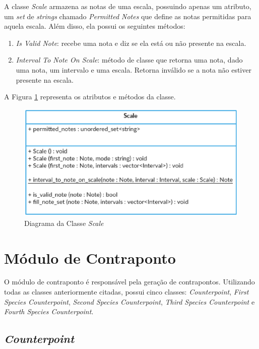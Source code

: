     A classe \textit{Scale} armazena as notas de uma escala, possuindo apenas um atributo, um \textit{set} de \textit{strings} chamado \textit{Permitted Notes} que define as notas permitidas para aquela escala. Além disso, ela possui os seguintes métodos:

    \begin{enumerate}
      \item \textit{Is Valid Note}: recebe uma nota e diz se ela está ou não presente na escala.
      \item \textit{Interval To Note On Scale}: método de classe que retorna uma nota, dado uma nota, um intervalo e uma escala. Retorna inválido se a nota não estiver presente na escala.
    \end{enumerate}


    A Figura \ref{scaleclass} representa os atributos e métodos da classe.

    \begin{figure}[htb]
      \centering
      \includegraphics[scale=0.7]{figuras/scaleclass.eps}
      \caption{Diagrama da Classe \textit{Scale}}
      \label{scaleclass}
    \end{figure}

  \section[Módulo de Contraponto]{Módulo de Contraponto}

    O módulo de contraponto é responsável pela geração de contrapontos. Utilizando todas as classes anteriormente citadas, possui cinco classes: \textit{Counterpoint}, \textit{First Species Counterpoint}, \textit{Second Species Counterpoint}, \textit{Third Species Counterpoint} e \textit{Fourth Species Counterpoint}.

    \subsection[\textit{Counterpoint}]{\textit{Counterpoint}}

